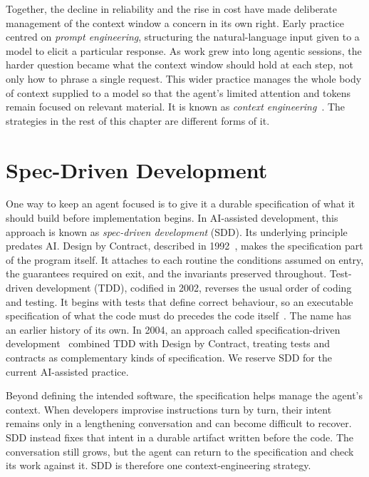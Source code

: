 Together, the decline in reliability and the rise in cost have made deliberate management of the context window a concern in its own right. Early practice centred on \emph{prompt engineering}, structuring the natural-language input given to a model to elicit a particular response. As work grew into long agentic sessions, the harder question became what the context window should hold at each step, not only how to phrase a single request. This wider practice manages the whole body of context supplied to a model so that the agent's limited attention and tokens remain focused on relevant material. It is known as \emph{context engineering}~\cite{rajasekaran2025contextengineering, boeckeler2026contextengineering}. The strategies in the rest of this chapter are different forms of it.

\section{Spec-Driven Development}
\label{sec:background-spec-driven-development}

One way to keep an agent focused is to give it a durable specification of what it should build before implementation begins. In AI-assisted development, this approach is known as \emph{spec-driven development} (SDD). Its underlying principle predates AI. Design by Contract, described in 1992~\cite{meyer1992dbc}, makes the specification part of the program itself. It attaches to each routine the conditions assumed on entry, the guarantees required on exit, and the invariants preserved throughout. Test-driven development (TDD), codified in 2002, reverses the usual order of coding and testing. It begins with tests that define correct behaviour, so an executable specification of what the code must do precedes the code itself~\cite{beck2002tdd}. The name has an earlier history of its own. In 2004, an approach called specification-driven development~\cite{ostroff2004specdriven} combined TDD with Design by Contract, treating tests and contracts as complementary kinds of specification. We reserve SDD for the current AI-assisted practice.

Beyond defining the intended software, the specification helps manage the agent's context. When developers improvise instructions turn by turn, their intent remains only in a lengthening conversation and can become difficult to recover. SDD instead fixes that intent in a durable artifact written before the code. The conversation still grows, but the agent can return to the specification and check its work against it. SDD is therefore one context-engineering strategy.

